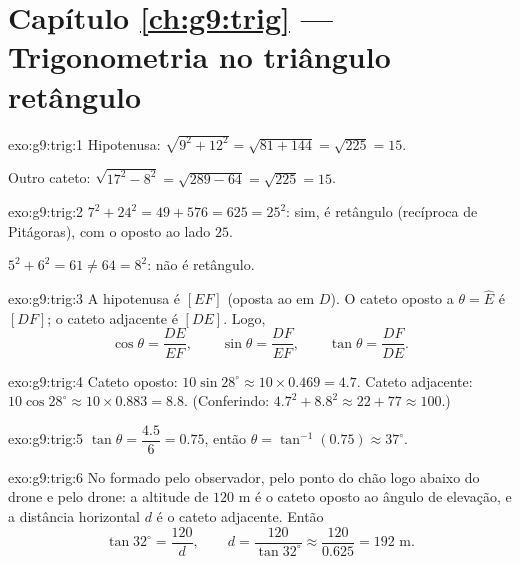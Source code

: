 \section*{Capítulo \ref{ch:g9:trig} --- Trigonometria no triângulo retângulo}

\begin{solution}{exo:g9:trig:1}
Hipotenusa: $\sqrt{9^2 + 12^2} = \sqrt{81 + 144} = \sqrt{225} = 15$.

Outro cateto: $\sqrt{17^2 - 8^2} = \sqrt{289 - 64} = \sqrt{225} = 15$.
\end{solution}

\begin{solution}{exo:g9:trig:2}
$7^2 + 24^2 = 49 + 576 = 625 = 25^2$: sim, é retângulo (recíproca de
Pitágoras), com o  oposto ao lado $25$.

$5^2 + 6^2 = 61 \neq 64 = 8^2$: não é retângulo.
\end{solution}

\begin{solution}{exo:g9:trig:3}
A hipotenusa é $[EF]$ (oposta ao  em $D$). O cateto oposto a
$\theta = \widehat E$ é $[DF]$; o cateto adjacente é $[DE]$. Logo,
\[
\cos\theta = \frac{DE}{EF}, \qquad
\sin\theta = \frac{DF}{EF}, \qquad
\tan\theta = \frac{DF}{DE}.
\]
\end{solution}

\begin{solution}{exo:g9:trig:4}
Cateto oposto: $10 \sin 28^\circ \approx 10 \times 0.469 = 4.7$.
Cateto adjacente: $10 \cos 28^\circ \approx 10 \times 0.883 = 8.8$.
(Conferindo: $4.7^2 + 8.8^2 \approx 22 + 77 \approx 100$.)
\end{solution}

\begin{solution}{exo:g9:trig:5}
$\tan\theta = \dfrac{4.5}{6} = 0.75$, então
$\theta = \tan^{-1}(0.75) \approx 37^\circ$.
\end{solution}

\begin{solution}{exo:g9:trig:6}
No  formado pelo observador, pelo ponto do chão logo
abaixo do drone e pelo drone: a altitude de $120$ m é o cateto oposto
ao ângulo de elevação, e a distância horizontal $d$ é o cateto
adjacente. Então
\[
\tan 32^\circ = \frac{120}{d},
\qquad
d = \frac{120}{\tan 32^\circ} \approx \frac{120}{0.625} = 192
\text{ m}.
\]
\end{solution}

